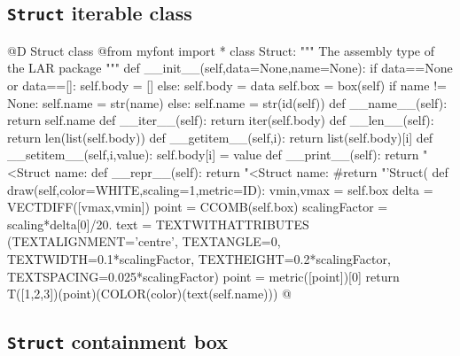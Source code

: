 \documentclass[11pt,oneside]{article}    %
\begin{document}
\subsection{\texttt{Struct} iterable class}
@D Struct class
@{from myfont import *
class Struct:
    """ The assembly type of the LAR package """
    def __init__(self,data=None,name=None):
        if data==None or data==[]:
            self.body = []
        else:
            self.body = data
            self.box = box(self) 
        if name != None: 
            self.name = str(name)
        else:
            self.name = str(id(self))
    def __name__(self):
        return self.name
    def __iter__(self):
        return iter(self.body)
    def __len__(self):
        return len(list(self.body))
    def __getitem__(self,i):
        return list(self.body)[i]
    def __setitem__(self,i,value):
        self.body[i] = value
    def __print__(self): 
        return "<Struct name: %
    def __repr__(self):
        return "<Struct name: %
        #return "'Struct(%
    def draw(self,color=WHITE,scaling=1,metric=ID):
        vmin,vmax = self.box
        delta = VECTDIFF([vmax,vmin])
        point = CCOMB(self.box)
        scalingFactor = scaling*delta[0]/20.
        text = TEXTWITHATTRIBUTES (TEXTALIGNMENT='centre', TEXTANGLE=0,
                    TEXTWIDTH=0.1*scalingFactor, 
                    TEXTHEIGHT=0.2*scalingFactor,
                    TEXTSPACING=0.025*scalingFactor)
        point = metric([point])[0]
        return T([1,2,3])(point)(COLOR(color)(text(self.name)))
@}


\subsection{\texttt{Struct} containment box}
\end{document}
